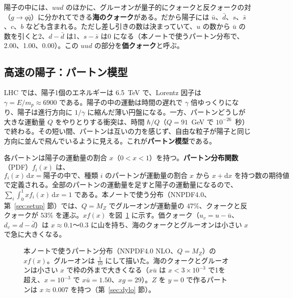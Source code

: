 \documentclass[a4paper,10pt]{ltjsarticle}
\newcommand{\dd}{\mathrm{d}}
\begin{document}
陽子の中には、$uud$ のほかに、グルーオンが量子的にクォークと反クォークの対（$g\to q\bar q$）に分かれてできる\textbf{海のクォーク}がある。だから陽子には $\bar u$、$\bar d$、$s$、$\bar s$、$c$、$b$ なども含まれる。ただし差し引きの数は決まっていて、$u$ の数から $\bar u$ の数を引くと2、$d-\bar d$ は1、$s-\bar s$ は0 になる（本ノートで使うパートン分布で、2.00、1.00、0.00）。この $uud$ の部分を\textbf{価クォーク}と呼ぶ。

\subsection{高速の陽子：パートン模型}\label{sec:partonmodel}

LHC では、陽子1個のエネルギーは 6.5~TeV で、Lorentz 因子は $\gamma=E/m_p\approx6900$ である。陽子の中の運動は時間の遅れで $\gamma$ 倍ゆっくりになり、陽子は進行方向に $1/\gamma$ に縮んだ薄い円盤になる。一方、パートンどうしが大きな運動量 $Q$ をやりとりする衝突は、時間 $\hbar/Q$（$Q=91$~GeV で $10^{-26}$~秒）で終わる。その短い間、パートンは互いの力を感じず、自由な粒子が陽子と同じ方向に並んで飛んでいるように見える。これが\textbf{パートン模型}である。

各パートンは陽子の運動量の割合 $x$（$0<x<1$）を持つ。\textbf{パートン分布関数}（PDF）$f_i(x)$ は、
\[
f_i(x)\,\dd x=\text{陽子の中で、種類 $i$ のパートンが運動量の割合 $x$ から $x+\dd x$ を持つ数の期待値}
\]
で定義される。全部のパートンの運動量を足すと陽子の運動量になるので、$\sum_i\int_0^1x f_i(x)\,\dd x=1$ である。本ノートで使う分布（NNPDF4.0、第~\ref{sec:setup} 節）では、$Q=M_Z$ でグルーオンが運動量の $47\%$、クォークと反クォークが $53\%$ を運ぶ。$x f(x)$ を図~\ref{fig:pdf} に示す。価クォーク（$u_v=u-\bar u$、$d_v=d-\bar d$）は $x\approx0.1$〜$0.3$ に山を持ち、海のクォークとグルーオンは小さい $x$ で急に大きくなる。

\begin{figure}[htbp]
\centering
{}
\caption{本ノートで使うパートン分布（NNPDF4.0 NLO、$Q=M_Z$）の $x f(x)$。グルーオンは $\frac1{10}$ にして描いた。海のクォークとグルーオンは小さい $x$ で枠の外まで大きくなる（$x\bar u$ は $x<3\times10^{-3}$ で1を超え、$x=10^{-3}$ で $x\bar u=1.50$、$xg=29$）。$Z$ を $y=0$ で作るパートンは $x\approx0.007$ を持つ（第~\ref{sec:dylo} 節）。}
\label{fig:pdf}
\end{figure}
\end{document}
